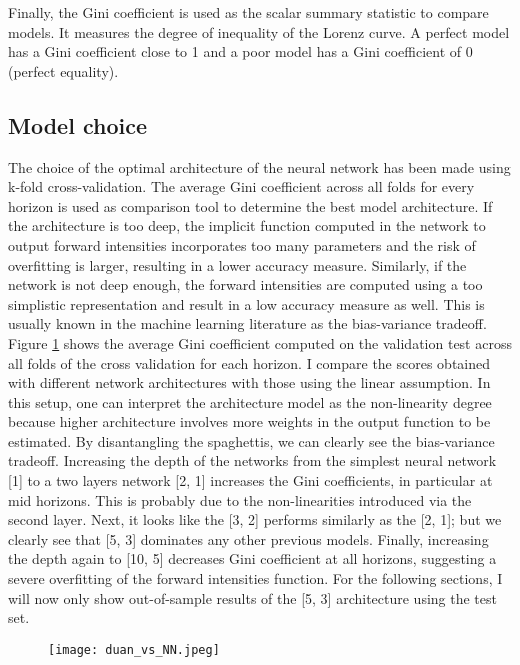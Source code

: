 Finally, the Gini coefficient is used as the scalar summary statistic to compare models. It measures the degree of inequality of the Lorenz curve. A perfect model has a Gini coefficient close to 1 and a poor model has a Gini coefficient of 0 (perfect equality).

\subsection{Model choice}
\label{sec4-1}

The choice of the optimal architecture of the neural network has been made using k-fold cross-validation. The average Gini coefficient across all folds for every horizon is used as comparison tool to determine the best model architecture. If the architecture is too deep, the implicit function computed in the network to output forward intensities incorporates too many parameters and the risk of overfitting is larger, resulting in a lower accuracy measure. Similarly, if the network is not deep enough, the forward intensities are computed using a too simplistic representation and result in a low accuracy measure as well. This is usually known in the machine learning literature as the bias-variance tradeoff. Figure \ref{fig:ginicomp} shows the average Gini coefficient computed on the validation test across all folds of the cross validation for each horizon. I compare the scores obtained with different network architectures with those using the linear assumption. In this setup, one can interpret the architecture model as the non-linearity degree because higher architecture involves more weights in the output function to be estimated. By disantangling the spaghettis, we can clearly see the bias-variance tradeoff. Increasing the depth of the networks from the simplest neural network [1] to a two layers network [2, 1] increases the Gini coefficients, in particular at mid horizons. This is probably due to the non-linearities introduced via the second layer. Next, it looks like the [3, 2] performs similarly as the [2, 1]; but we clearly see that [5, 3] dominates any other previous models. Finally, increasing the depth again to [10, 5] decreases Gini coefficient at all horizons, suggesting a severe overfitting of the forward intensities function. For the following sections, I will now only show out-of-sample results of the [5, 3] architecture using the test set. 

\begin{figure}
    \centering
    \texttt{[image: duan\_vs\_NN.jpeg]}
    \label{fig:ginicomp}
\end{figure}

